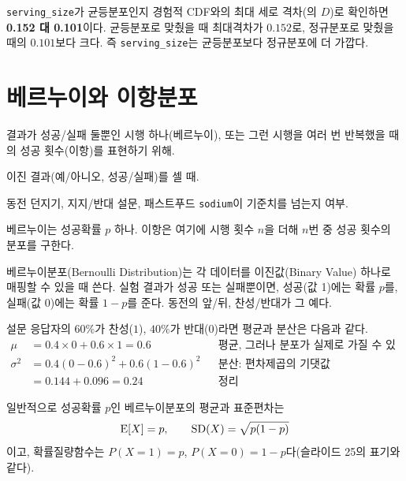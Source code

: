 \begin{pitfall}
\texttt{serving\_size}가 균등분포인지
경험적 CDF와의 최대 세로 격차(의 $D$)로 확인하면
\textbf{0.152 대 0.101}이다. 균등분포로 맞췄을 때 최대격차가 $0.152$로,
정규분포로 맞췄을 때의 $0.101$보다 크다. 즉 \texttt{serving\_size}는
균등분포보다 정규분포에 더 가깝다.
\end{pitfall}

\section{베르누이와 이항분포}
\label{sec:binomial}

\begin{inbrief}
  \item[Why] 결과가 성공/실패 둘뿐인 시행 하나(베르누이), 또는 그런
             시행을 여러 번 반복했을 때의 성공 횟수(이항)를 표현하기
             위해.
  \item[When] 이진 결과(예/아니오, 성공/실패)를 셀 때.
  \item[Where] 동전 던지기, 지지/반대 설문, 패스트푸드
               \texttt{sodium}이 기준치를 넘는지 여부.
  \item[How] 베르누이는 성공확률 $p$ 하나. 이항은 여기에 시행 횟수
             $n$을 더해 $n$번 중 성공 횟수의 분포를 구한다.
\end{inbrief}

베르누이분포(Bernoulli Distribution)는 각 데이터를 이진값(Binary Value)
하나로 매핑할 수 있을 때 쓴다. 실험 결과가 성공 또는 실패뿐이면, 성공(값
1)에는 확률 $p$를, 실패(값 0)에는 확률 $1-p$를 준다. 동전의 앞/뒤,
찬성/반대가 그 예다.

\begin{example}[지지율 설문]
\label{ex:dist-favorability}
설문 응답자의 $60\%$가 찬성($1$), $40\%$가 반대($0$)라면 평균과 분산은
다음과 같다.
\begin{align*}
  \mu &= 0.4\times 0 + 0.6\times 1 = \mathbf{0.6}
    && \text{평균, 그러나 분포가 실제로 가질 수 있는 값은 0과 1뿐}\\
  \sigma^2 &= 0.4(0-0.6)^2 + 0.6(1-0.6)^2 && \text{분산: 편차제곱의 기댓값}\\
           &= 0.144 + 0.096 = \mathbf{0.24} && \text{정리}
\end{align*}
\end{example}

일반적으로 성공확률 $p$인 베르누이분포의 평균과 표준편차는
\[
  \operatorname{E}[X] = p, \qquad \mathrm{SD}(X) = \sqrt{p(1-p)}
\]
이고, 확률질량함수는 $P(X=1)=p$, $P(X=0)=1-p$다(슬라이드 25의
표기와 같다).

